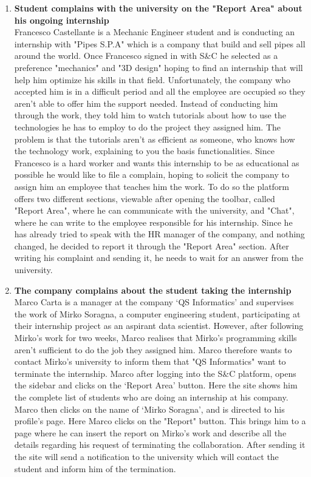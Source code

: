 \begin{enumerate}
      \item \textbf{Student complains with the university on the "Report Area" about his ongoing internship}\\
      Francesco Castellante is a Mechanic Engineer student and is conducting an internship with "Pipes S.P.A" which is a company that build and sell pipes all around the world. Once Francesco signed in with S\&C he selected as a preference "mechanics" and "3D design" hoping to find an internship that will help him optimize his skills in that field. Unfortunately, the company who accepted him is in a difficult period and all the employee are occupied so they aren't able to offer him the support needed. Instead of conducting him through the work, they told him to watch tutorials about how to use the technologies he has to employ to do the project they assigned him. The problem is that the tutorials aren't as efficient as someone, who knows how the technology work, explaining to you the basis functionalities. Since Francesco is a hard worker and wants this internship to be as educational as possible he would like to file a complain, hoping to solicit the company to assign him an employee that teaches him the work. To do so the platform offers two different sections, viewable after opening the toolbar, called "Report Area", where he can communicate with the university, and "Chat", where he can write to the employee responsible for his internship. Since he has already tried to speak with the HR manager of the company, and nothing changed, he decided to report it through the "Report Area" section. After writing his complaint and sending it, he needs to wait for an answer from the university.
      
      \item \textbf{The company complains about the student taking the internship}\\
      Marco Carta is a manager at the company ‘QS Informatics’ and supervises the work of Mirko Soragna, a computer engineering student, participating at their internship project as an aspirant data scientist. However, after following Mirko's work for two weeks, Marco realises that Mirko's programming skills aren't sufficient to do the job they assigned him. Marco therefore wants to contact Mirko's university to inform them that "QS Informatics" want to terminate the internship. Marco after logging into the S\&C platform, opens the sidebar and clicks on the ‘Report Area’ button. Here the site shows him the complete list of students who are doing an internship at his company. Marco then clicks on the name of ‘Mirko Soragna’, and is directed to his profile's page. Here Marco clicks on the "Report" button. This brings him to a page where he can insert the report on Mirko's work and describe all the details regarding his request of terminating the collaboration. After sending it the site will send a notification to the university which will contact the student and inform him of the termination.
      
\end{enumerate}


